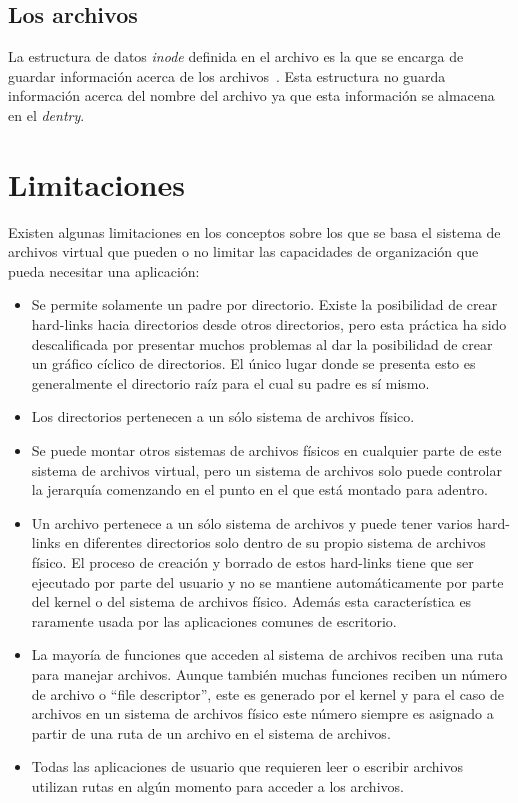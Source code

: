 \subsection{Los archivos}

La estructura de datos \textit{inode} definida en el archivo  es la que se encarga de guardar información acerca de los archivos~\cite{inode:website}. Esta estructura no guarda información acerca del nombre del archivo ya que esta información se almacena en el \textit{dentry}.


\section{Limitaciones}

Existen algunas limitaciones en los conceptos sobre los que se basa el sistema de archivos virtual que pueden o no limitar las capacidades de organización que pueda necesitar una aplicación:

\begin{itemize}
\item Se permite solamente un padre por directorio. Existe la posibilidad de crear hard-links hacia directorios desde otros directorios, pero esta práctica ha sido descalificada por presentar muchos problemas al dar la posibilidad de crear un gráfico cíclico de directorios. El único lugar donde se presenta esto es generalmente el directorio raíz para el cual su padre es sí mismo.
\item Los directorios pertenecen a un sólo sistema de archivos físico.
\item Se puede montar otros sistemas de archivos físicos en cualquier parte de este sistema de archivos virtual, pero un sistema de archivos solo puede controlar la jerarquía comenzando en el punto en el que está montado para adentro.
\item Un archivo pertenece a un sólo sistema de archivos y puede tener varios hard-links en diferentes directorios solo dentro de su propio sistema de archivos físico. El proceso de creación y borrado de estos hard-links tiene que ser ejecutado por parte del usuario y no se mantiene automáticamente por parte del kernel o del sistema de archivos físico. Además esta característica es raramente usada por las aplicaciones comunes de escritorio.
\item La mayoría de funciones que acceden al sistema de archivos reciben una ruta para manejar archivos. Aunque también muchas funciones reciben un número de archivo o ``file descriptor'', este es generado por el kernel y para el caso de archivos en un sistema de archivos físico este número siempre es asignado a partir de una ruta de un archivo en el sistema de archivos.
\item Todas las aplicaciones de usuario que requieren leer o escribir archivos utilizan rutas en algún momento para acceder a los archivos.
\end{itemize}

